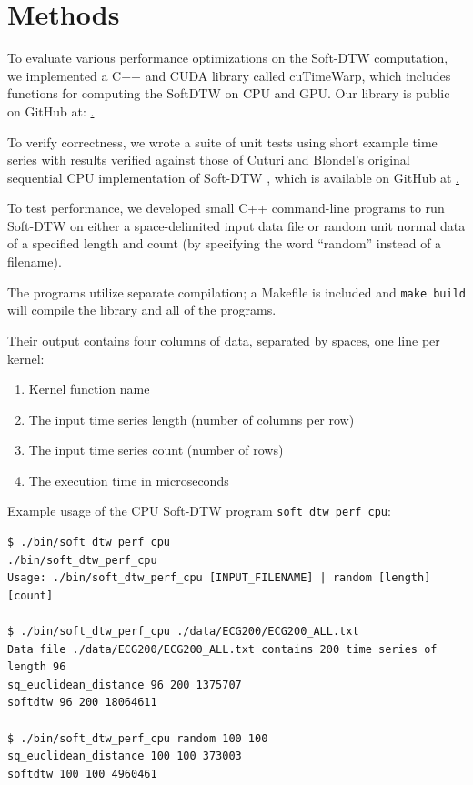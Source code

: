 \documentclass[12pt, letterpaper]{article}
\begin{document}
\section{Methods}

To evaluate various performance optimizations on the Soft-DTW computation, we
implemented a C++ and CUDA library called cuTimeWarp, which includes functions
for computing the SoftDTW on CPU and GPU. Our library is public on GitHub at:
\href{https://github.com/alexkyllo/cutimewarp}.

To verify correctness, we wrote a suite of unit tests using short example time
series with results verified against those of Cuturi and Blondel's original
sequential CPU implementation of Soft-DTW \cite{cuturi_soft-dtw_2018}, which is
available on GitHub at \href{https://github.com/mblondel/soft-dtw}.

To test performance, we developed small C++ command-line programs to run
Soft-DTW on either a space-delimited input data file or random unit normal data
of a specified length and count (by specifying the word ``random'' instead of a
filename).

The programs utilize separate compilation; a Makefile is included and
\verb|make build| will compile the library and all of the programs.

Their output contains four columns of data, separated by spaces, one line per
kernel:

\begin{enumerate}
  \item Kernel function name
  \item The input time series length (number of columns per row)
  \item The input time series count (number of rows)
  \item The execution time in microseconds
\end{enumerate}

Example usage of the CPU Soft-DTW program \verb|soft_dtw_perf_cpu|:

\begin{verbatim}
$ ./bin/soft_dtw_perf_cpu
./bin/soft_dtw_perf_cpu
Usage: ./bin/soft_dtw_perf_cpu [INPUT_FILENAME] | random [length] [count]

$ ./bin/soft_dtw_perf_cpu ./data/ECG200/ECG200_ALL.txt
Data file ./data/ECG200/ECG200_ALL.txt contains 200 time series of length 96
sq_euclidean_distance 96 200 1375707
softdtw 96 200 18064611

$ ./bin/soft_dtw_perf_cpu random 100 100
sq_euclidean_distance 100 100 373003
softdtw 100 100 4960461

\end{verbatim}
\end{document}
